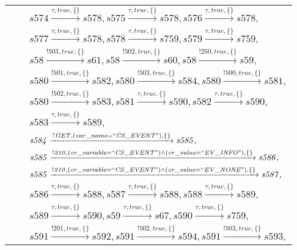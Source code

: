 \begin{tabular}{lcp{350px}}
& & $\mathit{s574}\xrightarrow{\mathit{\tau}, \mathit{true}, \{\}}\mathit{s578},\mathit{s575}\xrightarrow{\mathit{\tau}, \mathit{true}, \{\}}\mathit{s578},\mathit{s576}\xrightarrow{\mathit{\tau}, \mathit{true}, \{\}}\mathit{s578},$ \\
& & $\mathit{s577}\xrightarrow{\mathit{\tau}, \mathit{true}, \{\}}\mathit{s578},\mathit{s578}\xrightarrow{\mathit{\tau}, \mathit{true}, \{\}}\mathit{s759},\mathit{s579}\xrightarrow{\mathit{\tau}, \mathit{true}, \{\}}\mathit{s759},$ \\
& & $\mathit{s58}\xrightarrow{\mathit{!503}, \mathit{true}, \{\}}\mathit{s61},\mathit{s58}\xrightarrow{\mathit{!502}, \mathit{true}, \{\}}\mathit{s60},\mathit{s58}\xrightarrow{\mathit{!250}, \mathit{true}, \{\}}\mathit{s59},$ \\
& & $\mathit{s580}\xrightarrow{\mathit{!501}, \mathit{true}, \{\}}\mathit{s582},\mathit{s580}\xrightarrow{\mathit{!503}, \mathit{true}, \{\}}\mathit{s584},\mathit{s580}\xrightarrow{\mathit{!500}, \mathit{true}, \{\}}\mathit{s581},$ \\
& & $\mathit{s580}\xrightarrow{\mathit{!502}, \mathit{true}, \{\}}\mathit{s583},\mathit{s581}\xrightarrow{\mathit{\tau}, \mathit{true}, \{\}}\mathit{s590},\mathit{s582}\xrightarrow{\mathit{\tau}, \mathit{true}, \{\}}\mathit{s590},$ \\
& & $\mathit{s583}\xrightarrow{\mathit{\tau}, \mathit{true}, \{\}}\mathit{s589},$ \\
& & $\mathit{s584}\xrightarrow{\mathit{?GET}, \mathit{(var\_name = ``CS\_EVENT")}, \{\}}\mathit{s585},$ \\
& & $\mathit{s585}\xrightarrow{\mathit{!210}, \mathit{(cr\_variable = ``CS\_EVENT") \land (cr\_value = ``EV\_INFO")}, \{\}}\mathit{s586},$ \\
& & $\mathit{s585}\xrightarrow{\mathit{!210}, \mathit{(cr\_variable = ``CS\_EVENT") \land (cr\_value = ``EV\_NONE")}, \{\}}\mathit{s587},$ \\
& & $\mathit{s586}\xrightarrow{\mathit{\tau}, \mathit{true}, \{\}}\mathit{s588},\mathit{s587}\xrightarrow{\mathit{\tau}, \mathit{true}, \{\}}\mathit{s588},\mathit{s588}\xrightarrow{\mathit{\tau}, \mathit{true}, \{\}}\mathit{s589},$ \\
& & $\mathit{s589}\xrightarrow{\mathit{\tau}, \mathit{true}, \{\}}\mathit{s590},\mathit{s59}\xrightarrow{\mathit{\tau}, \mathit{true}, \{\}}\mathit{s67},\mathit{s590}\xrightarrow{\mathit{\tau}, \mathit{true}, \{\}}\mathit{s759},$ \\
& & $\mathit{s591}\xrightarrow{\mathit{!201}, \mathit{true}, \{\}}\mathit{s592},\mathit{s591}\xrightarrow{\mathit{!502}, \mathit{true}, \{\}}\mathit{s594},\mathit{s591}\xrightarrow{\mathit{!503}, \mathit{true}, \{\}}\mathit{s593},$ \\

\end{tabular}
